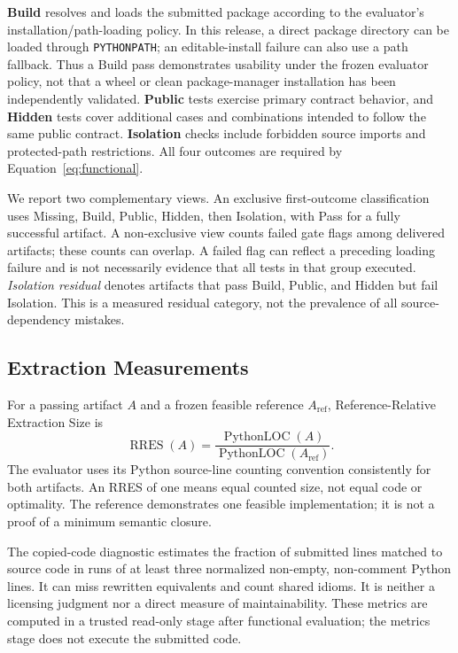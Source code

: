 \documentclass[acmsmall,screen,review,anonymous]{acmart}
\begin{document}
\textbf{Build} resolves and loads the submitted package according to the
evaluator's installation/path-loading policy. In this release, a direct package
directory can be loaded through \texttt{PYTHONPATH}; an editable-install failure
can also use a path fallback. Thus a Build pass demonstrates usability under the
frozen evaluator policy, not that a wheel or clean package-manager installation
has been independently validated. \textbf{Public} tests exercise primary
contract behavior, and \textbf{Hidden} tests cover additional cases and
combinations intended to follow the same public contract. \textbf{Isolation}
checks include forbidden source imports and protected-path restrictions.
All four outcomes are required by Equation~\ref{eq:functional}.

We report two complementary views. An exclusive first-outcome classification
uses Missing, Build, Public, Hidden, then Isolation, with Pass for a fully
successful artifact. A non-exclusive view counts failed gate flags among
delivered artifacts; these counts can overlap. A failed flag can reflect a
preceding loading failure and is not necessarily evidence that all tests in that
group executed. \emph{Isolation residual} denotes artifacts that pass Build,
Public, and Hidden but fail Isolation. This is a measured residual category,
not the prevalence of all source-dependency mistakes.

\subsection{Extraction Measurements}
\label{sec:metrics}

For a passing artifact $A$ and a frozen feasible reference $A_{\mathrm{ref}}$,
Reference-Relative Extraction Size is
\begin{equation}
 \operatorname{RRES}(A)=
 \frac{\operatorname{PythonLOC}(A)}{\operatorname{PythonLOC}(A_{\mathrm{ref}})}.
 \label{eq:rres}
\end{equation}
The evaluator uses its Python source-line counting convention consistently for
both artifacts. An RRES of one means equal counted size, not equal code or
optimality. The reference demonstrates one feasible implementation; it is not a
proof of a minimum semantic closure.

The copied-code diagnostic estimates the fraction of submitted lines matched
to source code in runs of at least three normalized non-empty, non-comment
Python lines. It can miss rewritten equivalents and count shared idioms. It is
neither a licensing judgment nor a direct measure of maintainability. These
metrics are computed in a trusted read-only stage after functional evaluation;
the metrics stage does not execute the submitted code.
\end{document}

